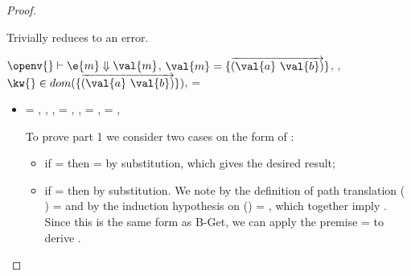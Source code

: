 \begin{lemma}
\begin{proof}
\begin{case}[BE-IsA2]
        Trivially reduces to an error.
      \end{case}

\begin{case}[B-Get]
      $\opsem {\openv{}} {\e{m}}{\val{m}}$,
        $\val{m} = {\curlymap{\overrightarrow{({\val{a}}\ {\val{b}})}}}$,
         \opsem {\openv{}} {} {\kw{}},
         $\keyinmap{\kw{}}{\curlymap{\overrightarrow{({\val{a}}\ {\val{b}})}}}$,
          {\kw{}} = {\val{}}

  \begin{itemize}
    \item[]
      \begin{subcase}[T-GetHMap]
  \ep{} = { {}},
  \judgementrewrite {\propenv{}} {} {\Unionsplice {\overrightarrow {\HMapgeneric {\mandatory{}} {\absent{}}}}}
           { {}}
           {}
           {},
  \judgementtworewrite {\propenv{}} {} {}{},
  \e{} = { {}},
   ,
  \thenprop{\prop{}} = {\topprop{}},
  \elseprop{\prop{}} = {\topprop{}},
                        {\object{}}


         To prove part 1 we consider two cases on the form of : 
         \begin{itemize}
           \item
         if {} = \emptyobject{}
         then \object{} = \emptyobject{} by substitution, which gives the desired result;
           \item
         if  = { {}}
         then  by substitution.
         We note by the definition of path translation
         {\openv{}}({ {}}) =
         {}
         and by the induction hypothesis on 
         {{\openv{}}()} = {},
         which together imply 
         \inopenv {\openv{}} {\object{}} { {\kw{}}}.
         Since this is the same form as B-Get, we can apply the premise
          {\kw{}} = {\val{}}
         to derive \inopenv {\openv{}} {\object{}} {\val{}}.
         \end{itemize}
         

\end{subcase}
\end{itemize}
\end{case}
\end{proof}
\end{lemma}
